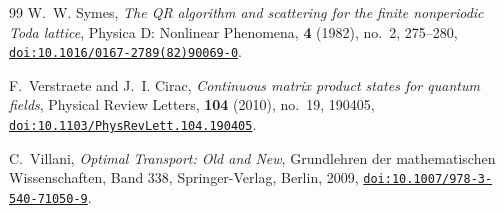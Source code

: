 \documentclass[11pt,a4paper,reqno]{amsart}
\theoremstyle{definition}
\numberwithin{equation}{section}
\providecommand{\doi}[1]{\href{https://doi.org/#1}{\texttt{doi:#1}}}
\begin{document}
\begin{thebibliography}{99}
W.~W. Symes,
\emph{The QR algorithm and scattering for the finite nonperiodic Toda lattice},
Physica D: Nonlinear Phenomena, \textbf{4} (1982), no.~2, 275--280,
\doi{10.1016/0167-2789(82)90069-0}.

F.~Verstraete and J.~I. Cirac,
\emph{Continuous matrix product states for quantum fields},
Physical Review Letters, \textbf{104} (2010), no.~19, 190405,
\doi{10.1103/PhysRevLett.104.190405}.

C.~Villani,
\emph{Optimal Transport: Old and New},
Grundlehren der mathematischen Wissenschaften, Band 338, Springer-Verlag, Berlin, 2009,
\doi{10.1007/978-3-540-71050-9}.

\end{thebibliography}
\end{document}
